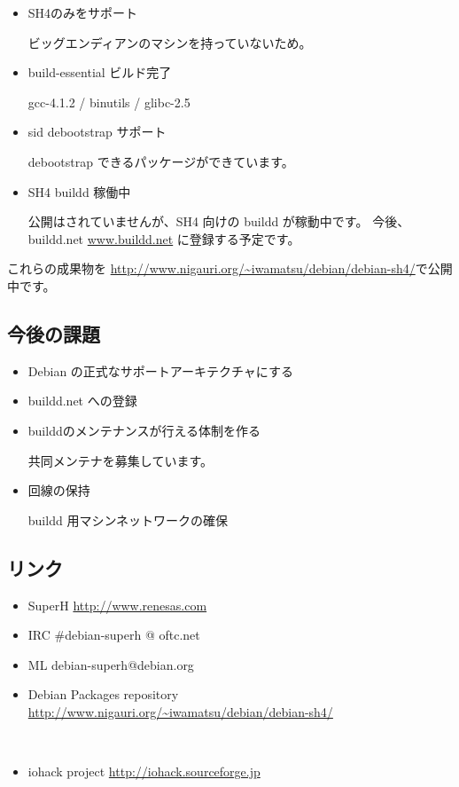 \documentclass[mingoth,a4paper]{jsarticle}
\begin{document}
\begin{itemize}
	\item SH4のみをサポート
	
		ビッグエンディアンのマシンを持っていないため。

	\item build-essential ビルド完了
	
		gcc-4.1.2 / binutils / glibc-2.5 

	\item sid debootstrap サポート
	
		debootstrap できるパッケージができています。

	\item SH4 buildd 稼働中
	
		公開はされていませんが、SH4 向けの buildd が稼動中です。
		今後、buildd.net \url{www.buildd.net} に登録する予定です。
		
\end{itemize}

これらの成果物を \url{http://www.nigauri.org/~iwamatsu/debian/debian-sh4/}で公開中です。

\subsection{今後の課題}

\begin{itemize}

\item Debian の正式なサポートアーキテクチャにする
\item buildd.net への登録
\item builddのメンテナンスが行える体制を作る

	共同メンテナを募集しています。
\item 回線の保持 

	buildd 用マシンネットワークの確保

\end{itemize}

\subsection{リンク}

\begin{itemize}
    \item SuperH \url{http://www.renesas.com}
    \item IRC \#debian-superh @ oftc.net
    \item ML  debian-superh@debian.org
    \item Debian Packages repository
	\url{http://www.nigauri.org/~iwamatsu/debian/debian-sh4/}

　　\item iohack project
	\url{http://iohack.sourceforge.jp}

\end{itemize}
\end{document}
